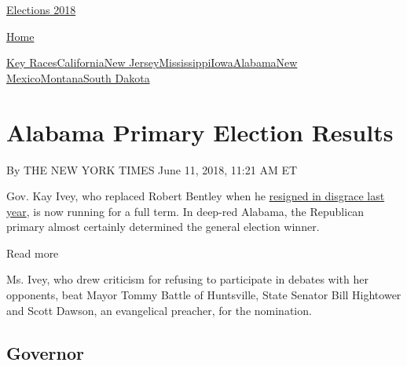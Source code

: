\href{//www.nytimes3xbfgragh.onion}{}\href{https://www.nytimes3xbfgragh.onion/interactive/2018/us/elections/calendar-primary-results.html}{
Elections 2018}

\href{//www.nytimes3xbfgragh.onion}{ Home}

\href{https://www.nytimes3xbfgragh.onion/interactive/2018/06/05/us/elections/results-california-new-jersey-iowa-primaries.html}{Key
Races}\href{https://www.nytimes3xbfgragh.onion/interactive/2018/06/05/us/elections/results-california-primary-elections.html}{California}\href{https://www.nytimes3xbfgragh.onion/interactive/2018/06/05/us/elections/results-new-jersey-primary-elections.html}{New
Jersey}\href{https://www.nytimes3xbfgragh.onion/interactive/2018/06/05/us/elections/results-mississippi-primary-elections.html}{Mississippi}\href{https://www.nytimes3xbfgragh.onion/interactive/2018/06/05/us/elections/results-iowa-primary-elections.html}{Iowa}\href{https://www.nytimes3xbfgragh.onion/interactive/2018/06/05/us/elections/results-alabama-primary-elections.html}{Alabama}\href{https://www.nytimes3xbfgragh.onion/interactive/2018/06/05/us/elections/results-new-mexico-primary-elections.html}{New
Mexico}\href{https://www.nytimes3xbfgragh.onion/interactive/2018/06/05/us/elections/results-montana-primary-elections.html}{Montana}\href{https://www.nytimes3xbfgragh.onion/interactive/2018/06/05/us/elections/results-south-dakota-primary-elections.html}{South
Dakota}

\hypertarget{alabama-primary-election-results}{%
\section{Alabama Primary Election
Results}\label{alabama-primary-election-results}}

By THE NEW YORK TIMES June 11, 2018, 11:21 AM ET

Gov. Kay Ivey, who replaced Robert Bentley when he
\href{https://www.nytimes3xbfgragh.onion/2017/04/10/us/robert-bentley-alabama-governor.html}{resigned
in disgrace last year}, is now running for a full term. In deep-red
Alabama, the Republican primary almost certainly determined the general
election winner.

Read more

Ms. Ivey, who drew criticism for refusing to participate in debates with
her opponents, beat Mayor Tommy Battle of Huntsville, State Senator Bill
Hightower and Scott Dawson, an evangelical preacher, for the nomination.

\hypertarget{governor}{%
\subsection{Governor}\label{governor}}

